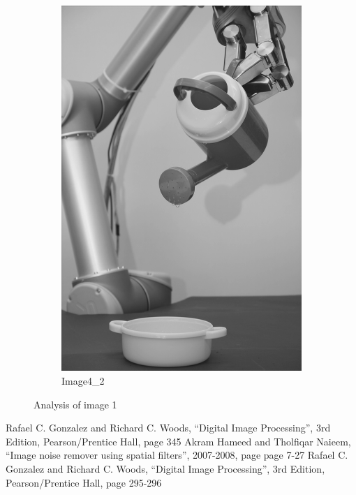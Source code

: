 \documentclass[11pt]{article}
\begin{document}
\begin{figure}[H]
\begin{subfigure}[b]{0.23\textwidth}
        \includegraphics[width=\textwidth]{img4/filteredOutput_6509_contrast_strech.png}
        \caption{Image4\_2}
        \label{fig:result_img_4}
    \end{subfigure}
    \caption{Analysis of image 1}\label{fig:con_fig}
\end{figure}



\newpage
\begin{thebibliography}{widest entry}
 Rafael C. Gonzalez and Richard C. Woods, “Digital Image Processing”, 3rd Edition, Pearson/Prentice Hall, page 345
 Akram Hameed and Tholfiqar Naieem, “Image noise remover using spatial filters”, 2007-2008, page page 7-27
 Rafael C. Gonzalez and Richard C. Woods, “Digital Image Processing”, 3rd Edition, Pearson/Prentice Hall, page 295-296
\end{thebibliography}
\end{document}
